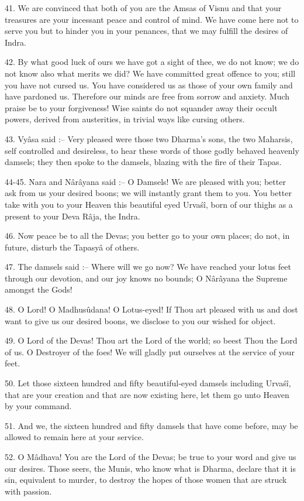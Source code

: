 41. We are convinced that both of you are the Amsas of Visnu and that your treasures are your incessant peace and control of mind. We have come here not to serve you but to hinder you in your penances, that we may fulfill the desires of Indra.

42. By what good luck of ours we have got a sight of thee, we do not know; we do not know also what merits we did? We have committed great offence to you; still you have not cursed us. You have considered us as those of your own family and have pardoned us. Therefore our minds are free from sorrow and anxiety. Much praise be to your forgiveness! Wise saints do not squander away their occult powers, derived from austerities, in trivial ways like cursing others.

43. Vy\^asa said :-- Very pleased were those two Dharma's sons, the two Maharsis, self controlled and desireless, to hear these words of those godly behaved heavenly damsels; they then spoke to the damsels, blazing with the fire of their Tapas.

44-45. Nara and N\^ar\^ayana said :-- O Damsels! We are pleased with you; better ask from us your desired boons; we will instantly grant them to you. You better take with you to your Heaven this beautiful eyed Urva\'s\^i, born of our thighs as a present to your Deva R\^aja, the Indra.

46. Now peace be to all the Devas; you better go to your own places; do not, in future, disturb the Tapasy\^a of others.

47. The damsels said :-- Where will we go now? We have reached your lotus feet through our devotion, and our joy knows no bounds; O N\^ar\^ayana the Supreme amongst the Gods!

48. O Lord! O Madhusûdana! O Lotus-eyed! If Thou art pleased with us and dost want to give us our desired boons, we disclose to you our wished for object.

49. O Lord of the Devas! Thou art the Lord of the world; so beest Thou the Lord of us. O Destroyer of the foes! We will gladly put ourselves at the service of your feet.

50. Let those sixteen hundred and fifty beautiful-eyed damsels including Urva\'s\^i, that are your creation and that are now existing here, let them go unto Heaven by your command.

51. And we, the sixteen hundred and fifty damsels that have come before, may be allowed to remain here at your service.

52. O M\^adhava! You are the Lord of the Devas; be true to your word and give us our desires. Those seers, the Munis, who know what is Dharma, declare that it is sin, equivalent to murder, to destroy the hopes of those women that are struck with passion.

